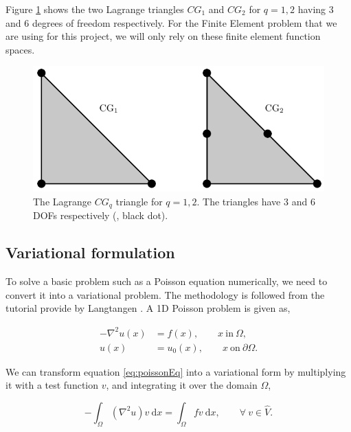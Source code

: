 Figure \ref{fig:continuousGalerkin} shows the two Lagrange triangles $CG_1$ and $CG_2$ for $q = 1,2$ having $3$ and $6$ degrees of freedom respectively. For the Finite Element problem that we are using for this project, we will only rely on these finite element function spaces. 

	\begin{figure}[t]
	\centering
	\includegraphics[width=0.6\linewidth]{./figures/eulerian/continuousGalerkin.pdf}
	\caption{The Lagrange $CG_q$ triangle for $q = 1, 2$. The triangles have $3$ and $6$ DOFs respectively ({\color{black}{$\bullet$}}, black dot).}
	\label{fig:continuousGalerkin}
	\end{figure}



\subsection*{Variational formulation}
\label{subsec:variationalProblem}

To solve a basic problem such as a Poisson equation numerically, we need to convert it into a variational problem. The methodology is followed from the \fenics tutorial provide by Langtangen \cite{Logg2012a}. A 1D Poisson problem is given as,

	\begin{equation}
	\begin{aligned}
	- \nabla^2 u(x) &= f(x), \qquad x\ \mathrm{in}\ \Omega,\\
	u(x) &= u_0(x), \qquad x\ \mathrm{on}\ \partial\Omega.
	\end{aligned}
	\label{eq:poissonEq}
	\end{equation}
	
We can transform equation \ref{eq:poissonEq} into a variational form by multiplying it with a test function $v$, and integrating it over the domain $\Omega$,


	\begin{equation}
	- \int_{\Omega} \left(\nabla^2 u\right)v\ \mathrm{d}x= \int_{\Omega} fv\ \mathrm{d}x, \qquad \forall\ v \in \hat{V}.
	\label{eq:poissonEqVariationFormA}
	\end{equation}


